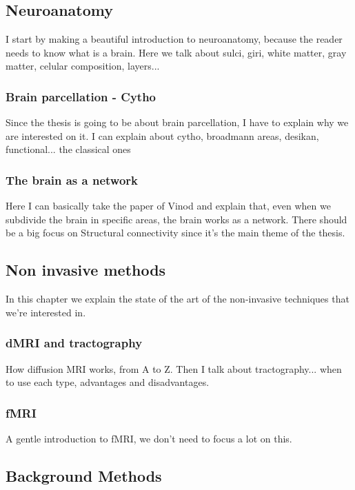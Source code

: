 \subsection{Neuroanatomy}

I start by making a beautiful introduction to neuroanatomy, because the reader needs to know what is a brain.
Here we talk about sulci, giri, white matter, gray matter, celular composition, layers...

\subsubsection{Brain parcellation - Cytho}
Since the thesis is going to be about brain parcellation, I have to explain why we are interested on it.
I can explain about cytho, broadmann areas, desikan, functional... the classical ones

\subsubsection{The brain as a network}
Here I can basically take the paper of Vinod and explain that, even when we subdivide the brain in specific areas, the brain works as a network.
There should be a big focus on Structural connectivity since it's the main theme of the thesis.

\subsection{Non invasive methods}
In this chapter we explain the state of the art of the non-invasive techniques that we're interested in.
 
\subsubsection{dMRI and tractography}
How diffusion MRI works, from A to Z.
Then I talk about tractography... when to use each type, advantages and disadvantages.

\subsubsection{fMRI}
A gentle introduction to fMRI, we don't need to focus a lot on this.

\subsection{Background Methods}


